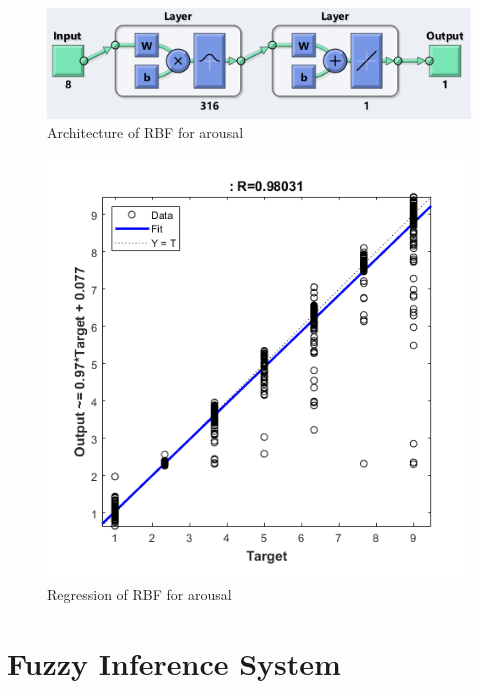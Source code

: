 \documentclass[a4paper]{report}
\begin{document}
	
	\begin{figure}[htbp]
		\centering
		\includegraphics[scale=1]{img/rbf_arousal.png}
		\caption{Architecture of RBF for arousal}
		\label{img: rbf_arousal}
	\end{figure}

	\begin{figure}[htbp]
		\centering
		\includegraphics[scale=1]{img/regression_rbf_arousal.png}
		\caption{Regression of RBF for arousal}
		\label{img: regression_rbf_arousal}
	\end{figure}
	
	\chapter{Fuzzy Inference System}
	
\end{document}
